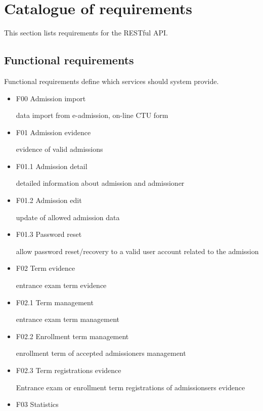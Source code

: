 	\section{Catalogue of requirements}\label{sec:catalogue}
	
	This section lists requirements for the RESTful API. 
	
	\subsection{Functional requirements}
	
	Functional requirements define which services should system provide. 
	\begin{itemize}
		\item F00 Admission import
	
		data import from e-admission, on-line CTU form
		
		\item F01 Admission evidence
	
		evidence of valid admissions
		
		\item F01.1 Admission detail
		
		detailed information about admission and admissioner
		
		\item F01.2 Admission edit
		
		update of allowed admission data
		
		\item F01.3 Password reset
		
		allow password reset/recovery to a valid user account related to the admission
	
		\item F02 Term evidence
	
		entrance exam term evidence
		
		\item F02.1 Term management
		
		entrance exam term management
		
		\item F02.2 Enrollment term management
	
		enrollment term of accepted admissioners management
		
		\item F02.3 Term registrations evidence
	
		Entrance exam or enrollment term registrations of admissionsers evidence
	
		\item F03 Statistics
	

\end{itemize}

